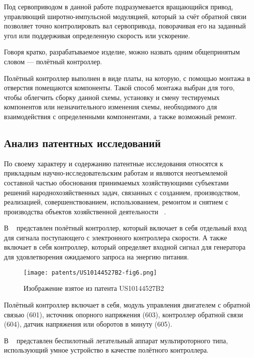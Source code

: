 Под сервоприводом в данной работе подразумевается вращающийся привод,
управляющий широтно-импульсной модуляцией, который за счёт обратной
связи позволяет точно контролировать вал сервопривода, поворачивая его
на заданный угол или поддерживая определенную скорость или ускорение.

Говоря кратко, разрабатываемое изделие, можно назвать одним
общепринятым словом — полётный контроллер.

Полётный контроллер выполнен в виде платы, на которую, с помощью
монтажа в отверстия помещаются компоненты. Такой способ монтажа выбран
для того, чтобы облегчить сборку данной схемы, установку и смену
тестируемых компонентов или незначительного изменения схемы,
необходимого для взаимодействия с определенными компонентами, а также
возможный ремонт.


\subsection{Анализ патентных исследований}

По своему характеру и содержанию патентные исследования относятся к
прикладным научно-исследовательским работам и являются неотъемлемой
составной частью обоснования принимаемых хозяйствующими субъектами
решений народнохозяйственных задач, связанных с созданием,
производством, реализацией, совершенствованием, использованием,
ремонтом и снятием с производства
объектов хозяйственной деятельности ~\cite{GOST-R-15.011-96}.

В ~\cite{US10144527B2} представлен полётный контроллер, который
включает в себя отдельный вход для сигнала поступающего с электронного
контроллера скорости. А также включает в себя контроллер, который
определяет входной сигнал для генератора для удовлетворения ожидаемого
запроса на энергию питания.


\begin{figure}[H]
  \centering
  \texttt{[image: patents/US10144527B2-fig6.png]}
  \caption{Изображение взятое из патента US10144527B2}
\end{figure}

Полётный контроллер включает в себя, модуль управления двигателем с
обратной связью (601), источник опорного напряжения (603), контроллер
обратной связи (604), датчик напряжения или оборотов в минуту (605).


В ~\cite{TW202504822A} представлен беспилотный летательный аппарат
мультироторного типа, использующий умное устройство в качестве
полётного контроллера.


